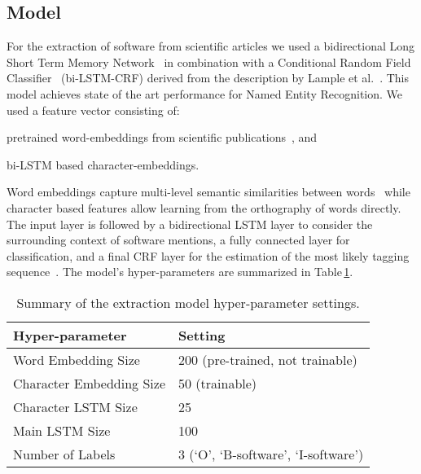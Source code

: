 \documentclass[runningheads]{llncs}
\newcommand{\tabref}[1]{Table\,\ref{#1}}
\begin{document}
\subsection{Model}
For the extraction of software from scientific articles we used a bidirectional Long Short Term Memory Network~\cite{hochreiter1997long} in combination with a Conditional Random Field Classifier~\cite{lafferty2001conditional} (bi-LSTM-CRF) derived from the description by Lample et al.~\cite{lample2016neural}.
This model achieves state of the art performance for Named Entity Recognition.
We used a feature vector consisting of:
\begin{inparaenum}[1.)]
    \item pretrained word-embeddings from scientific publications~\cite{Pyysalo2013DistributionalSR}, and 
    \item bi-LSTM based character-embeddings.
\end{inparaenum} 
Word embeddings capture multi-level semantic similarities between words~\cite{mikolov2013distributed} while character based features allow learning from the orthography of words directly.
The input layer is followed by a bidirectional LSTM layer to consider the surrounding context of software mentions, a fully connected layer for classification, and a final CRF layer for the estimation of the most likely tagging sequence~\cite{lample2016neural}.
The model's hyper-parameters are summarized in \tabref{tab:model_config}.
\begin{table}[bt]
    \caption{Summary of the extraction model hyper-parameter settings.}
    \label{tab:model_config}
    \centering
    \begin{tabular}{ll}
        \toprule
        Hyper-parameter & Setting  \\  
        \midrule
        Word Embedding Size & 200 (pre-trained, not trainable)\\ 
        Character Embedding Size & 50 (trainable)\\
        Character LSTM Size & 25 \\
        Main LSTM Size & 100 \\
        Number of Labels & 3 (`O', `B-software', `I-software') \\
        \bottomrule
    \end{tabular}
\end{table}
\end{document}
